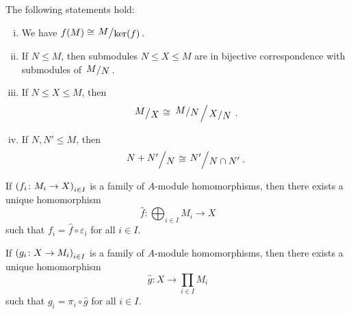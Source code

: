 \begin{izrek}
The following statements hold:

\begin{enumerate}[i)]
\item We have $f(M) \cong \kvoc{M}{\ker(f)}$.
\item If $N \leq M$, then submodules $N \leq X \leq M$ are in
bijective correspondence with submodules of $\kvoc{M}{N}$.
\item If $N \leq X \leq M$, then
\[
\kvoc{M}{X} \cong \kvoc{\kvoc{M}{N}}{\kvoc{X}{N}}.
\]
\item If $N, N' \leq M$, then
\[
\kvoc{N+N'}{N} \cong \kvoc{N'}{N \cap N'}.
\]
\end{enumerate}
\end{izrek}

\begin{izrek}
If $\left(f_i \colon M_i \to X\right)_{i \in I}$ is a family of $A$-module
homomorphisms, then there exists a unique homomorphism
\[
\hat{f} \colon \bigoplus_{i \in I} M_i \to X
\]
such that $f_i = \hat{f} \circ \varepsilon_i$ for all $i \in I$.

If $\left(g_i \colon X \to M_i\right)_{i \in I}$ is a family of $A$-module
homomorphisms, then there exists a unique homomorphism
\[
\hat{g} \colon X \to \prod_{i \in I} M_i
\]
such that $g_i = \pi_i \circ \hat{g}$ for all $i \in I$.
\end{izrek}
